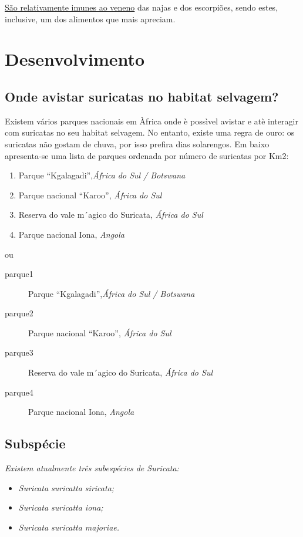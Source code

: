 \documentclass[a4paper,11pt]{report}
\begin{document}
	\uline{São relativamente imunes ao veneno} das najas
	e dos escorpiões, sendo estes, inclusive, um dos alimentos que mais
	apreciam.

\chapter{Desenvolvimento}

\section{Onde avistar suricatas no habitat selvagem?}
	Existem vários parques nacionais em Àfrica onde è possìvel avistar e
	atè interagir com suricatas no seu habitat selvagem. No entanto, existe
	uma regra de ouro: os suricatas não gostam de chuva, por isso prefira
	dias solarengos.
	Em baixo apresenta-se uma lista de parques ordenada por número de
	suricatas por Km2:

	\begin{enumerate}
		\item Parque “Kgalagadi”,\textit{África do Sul / Botswana}
		\item Parque nacional “Karoo”, \textit{África do Sul}
		\item Reserva do vale m´agico do Suricata, \textit{África do Sul}
		\item Parque nacional Iona, \textit{Angola}
	\end{enumerate}

ou

	\begin{description}
		\item[parque1] Parque “Kgalagadi”,\textit{África do Sul / Botswana}
		\item[parque2] Parque nacional “Karoo”, \textit{África do Sul}
		\item[parque3] Reserva do vale m´agico do Suricata, \textit{África do Sul}
		\item[parque4] Parque nacional Iona, \textit{Angola}
	\end{description}


\section{Subspécie}
	\textit{Existem atualmente três subespécies de Suricata:}


	\begin{itemize}
		\item \textit{Suricata suricatta siricata;}
		\item \textit{Suricata suricatta iona;}
		\item \textit{Suricata suricatta majoriae.}
	\end{itemize}
\end{document}

